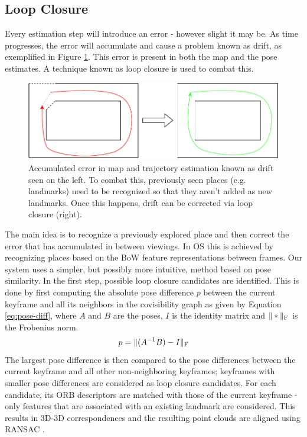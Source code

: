 \documentclass[a4paper, 10pt]{article}
\begin{document}
\subsection{Loop Closure}
\label{sec:orgb749bc5}
Every estimation step will introduce an error - however slight it may be. As time progresses, the error will accumulate and cause a problem known as drift, as exemplified in Figure \ref{fig:org756346f}.
This error is present in both the map and the pose estimates. A technique known as loop closure is used to combat this.
\begin{figure}[htbp]
\centering
\includegraphics[width=0.5\linewidth]{./resources/drift.pdf}
\caption{\label{fig:org756346f}
Accumulated error in map and trajectory estimation known as drift seen on the left. To combat this, previously seen places (e.g. landmarks) need to be recognized so that they aren't added as new landmarks. Once this happens, drift can be corrected via loop closure (right).}
\end{figure}
The main idea is to recognize a previously explored place and then correct the error that has accumulated in between viewings. 
In OS this is achieved by recognizing places based on the BoW feature representations between frames. Our system uses a simpler, but possibly more intuitive, method based on pose similarity.
In the first step, possible loop closure candidates are identified. This is done by first computing the absolute pose difference \(p\) between the current keyframe and all its neighbors 
in the covisibility graph as given by Equation \ref{eq:pose-diff}, where \(A\) and \(B\) are the poses, \(I\) is the identity matrix and \(\|*\|_{\rm {F}}\) is the Frobenius norm. 
\begin{equation}
\label{eq:pose-diff}
p = \|(A^{-1} B) - I\|_{\rm {F}}
\end{equation}
The largest pose difference is then compared to the pose differences between the current keyframe and all other non-neighboring keyframes; 
keyframes with smaller pose differences are considered as loop closure candidates. For each candidate, its ORB descriptors are matched with those of the current keyframe - only features that are associated with an 
existing landmark are considered. This results in 3D-3D correspondences and the resulting point clouds are aligned using RANSAC \cite{ransac}.
\end{document}

